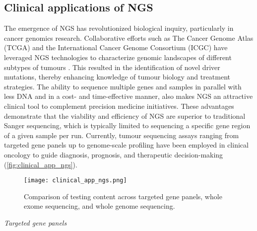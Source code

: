 
\subsection{Clinical applications of NGS}

The emergence of NGS has revolutionized biological inquiry, particularly in cancer genomics research. Collaborative efforts such as The Cancer Genome Atlas (\acs{TCGA}) and the International Cancer Genome Consortium (\acs{ICGC}) have leveraged NGS technologies to characterize genomic landscapes of different subtypes of tumours \cite{Robertson2017, Raphael2017, Ally2017, Nik-Zainal2016, Tirode2014}. This resulted in the identification of novel driver mutations, thereby enhancing knowledge of tumour biology and treatment strategies. The ability to sequence multiple genes and samples in parallel with less DNA and in a cost- and time-effective manner, also makes NGS an attractive clinical tool to complement precision medicine initiatives. These advantages demonstrate that the viability and efficiency of NGS are superior to traditional Sanger sequencing, which is typically limited to sequencing a specific gene region of a given sample per run. Currently, tumour sequencing assays ranging from targeted gene panels up to genome-scale profiling have been employed in clinical oncology to guide diagnosis, prognosis, and therapeutic decision-making (\autoref{fig:clinical_app_ngs}).


\begin{figure}[H]
	\centering
	\texttt{[image: clinical\_app\_ngs.png]}
	\caption{Comparison of testing content across targeted gene panels, whole exome sequencing, and whole genome sequencing.}
	\label{fig:clinical_app_ngs}
\end{figure}


\vspace{5mm}
\noindent\textit{Targeted gene panels}

